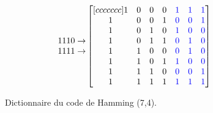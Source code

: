 \documentclass [a4paper, 11pt] {article}
\begin{document}
\begin{figure}[H]
\begin{equation*}
\begin{matrix}
               1110 \rightarrow \\
               1111 \rightarrow \\
            \end{matrix}
            \begin{bmatrix}[ccccccc]
               1 & 0 & 0 & 0 & \color{blue} 1 & \color{blue} 1 & \color{blue} 1 \\
               1 & 0 & 0 & 1 & \color{blue} 0 & \color{blue} 0 & \color{blue} 1 \\
               1 & 0 & 1 & 0 & \color{blue} 1 & \color{blue} 0 & \color{blue} 0 \\
               1 & 0 & 1 & 1 & \color{blue} 0 & \color{blue} 1 & \color{blue} 0 \\
               1 & 1 & 0 & 0 & \color{blue} 0 & \color{blue} 1 & \color{blue} 0 \\
               1 & 1 & 0 & 1 & \color{blue} 1 & \color{blue} 0 & \color{blue} 0 \\
               1 & 1 & 1 & 0 & \color{blue} 0 & \color{blue} 0 & \color{blue} 1 \\
               1 & 1 & 1 & 1 & \color{blue} 1 & \color{blue} 1 & \color{blue} 1 \\
            \end{bmatrix}
        \end{equation*}
        \caption{Dictionnaire du code de Hamming (7,4).}
        \label{fig:encodage_hamming_7_4}
    \end{figure}
    
\end{document}
